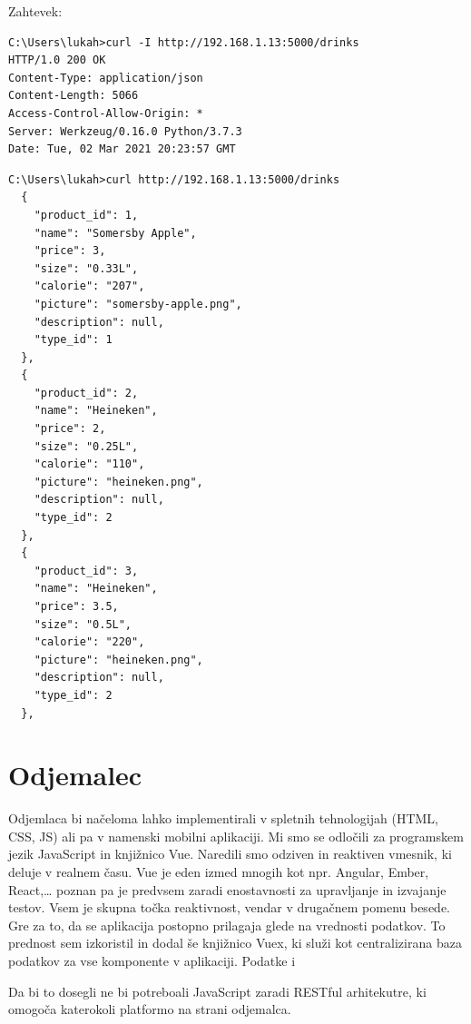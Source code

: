 \documentclass[a4paper, 12pt]{book}
\begin{document}
Zahtevek:

\begin{verbatim}
C:\Users\lukah>curl -I http://192.168.1.13:5000/drinks
HTTP/1.0 200 OK
Content-Type: application/json
Content-Length: 5066
Access-Control-Allow-Origin: *
Server: Werkzeug/0.16.0 Python/3.7.3
Date: Tue, 02 Mar 2021 20:23:57 GMT
\end{verbatim}

\begin{verbatim}
C:\Users\lukah>curl http://192.168.1.13:5000/drinks 
  {
    "product_id": 1,
    "name": "Somersby Apple",
    "price": 3,
    "size": "0.33L",
    "calorie": "207",
    "picture": "somersby-apple.png",
    "description": null,
    "type_id": 1
  },
  {
    "product_id": 2,
    "name": "Heineken",
    "price": 2,
    "size": "0.25L",
    "calorie": "110",
    "picture": "heineken.png",
    "description": null,
    "type_id": 2
  },
  {
    "product_id": 3,
    "name": "Heineken",
    "price": 3.5,
    "size": "0.5L",
    "calorie": "220",
    "picture": "heineken.png",
    "description": null,
    "type_id": 2
  },
\end{verbatim}

\section{Odjemalec}

Odjemlaca bi načeloma lahko implementirali v spletnih tehnologijah (HTML, CSS, JS) ali pa v namenski mobilni aplikaciji. Mi smo se odločili za programskem jezik JavaScript in knjižnico Vue.  Naredili smo odziven in reaktiven vmesnik, ki deluje v realnem času. Vue je eden izmed mnogih kot npr. Angular, Ember, React,… poznan pa je predvsem zaradi enostavnosti za upravljanje in izvajanje testov. Vsem je skupna točka reaktivnost, vendar v drugačnem pomenu besede. Gre za to, da se aplikacija postopno prilagaja glede na vrednosti podatkov. To prednost sem izkoristil in dodal še knjižnico Vuex, ki služi kot centralizirana baza podatkov za vse komponente v aplikaciji. Podatke i

Da bi to dosegli ne bi potreboali JavaScript zaradi RESTful arhitekutre, ki omogoča katerokoli platformo na strani odjemalca.
\end{document}
